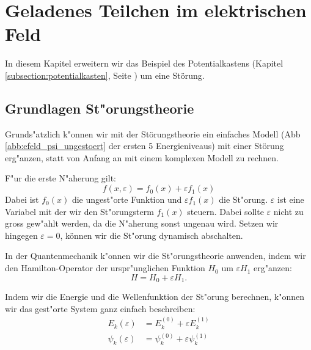 \chapter{Geladenes Teilchen im elektrischen Feld\label{chapter:efeld}}
\begin{refsection}


In diesem Kapitel erweitern wir das Beispiel des Potentialkastens 
(Kapitel \ref{subsection:potentialkasten}, Seite \pageref{subsection:potentialkasten})
um eine St\"orung.

\section{Grundlagen St"orungstheorie}
Grunds"atzlich k"onnen wir mit der St\"orungstheorie ein einfaches Modell 
(Abb \ref{abb:efeld_psi_ungestoert} der ersten 5 Energieniveaus) 
mit einer St\"orung erg"anzen, statt von Anfang an mit einem komplexen Modell zu rechnen.

F"ur die erste N"aherung gilt:
\[
  f(x, \varepsilon) = f_0(x) + \varepsilon f_1(x)
\]
Dabei ist $f_0(x)$ die ungest"orte Funktion und $\varepsilon f_1(x)$ die St"orung.
$\varepsilon$ ist eine Variabel mit der wir den St"orungsterm $f_1(x)$ steuern.
Dabei sollte $\varepsilon$ nicht zu gross gew"ahlt werden,
da die N"aherung sonst ungenau wird.
Setzen wir hingegen $\varepsilon = 0$, k\"onnen wir die St"orung dynamisch abschalten.




In der Quantenmechanik k"onnen wir die St"orungstheorie anwenden,
indem wir den Hamilton-Operator der urspr"unglichen Funktion $H_0$
um $\varepsilon H_1$ erg"anzen:
\[
  H = H_0 + \varepsilon H_1.
\]

Indem wir die Energie und die Wellenfunktion der St"orung berechnen, k"onnen wir das gest"orte System ganz einfach beschreiben:
\begin{equation}
\begin{aligned}
E_k(\varepsilon)&=E_k^{(0)} + \varepsilon E_k^{(1)}
\\
\psi_k(\varepsilon)&=\psi_k^{(0)} + \varepsilon \psi_k^{(1)}
\end{aligned}
\end{equation}


\end{refsection}
